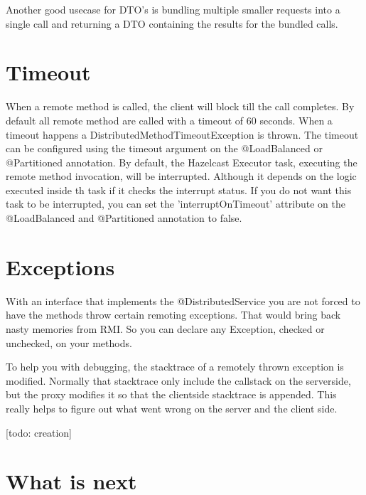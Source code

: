 Another good usecase for DTO's is bundling multiple smaller requests into a single call and returning a DTO containing the results for the bundled calls.

\section{Timeout}
When a remote method is called, the client will block till the call completes. By default all remote method are called with a timeout of 60 seconds. When a timeout happens a DistributedMethodTimeoutException is thrown. The timeout can be configured using the timeout argument on the @LoadBalanced or @Partitioned annotation. By default, the Hazelcast Executor task, executing the remote method invocation, will be interrupted. Although it depends on the logic executed inside th task if it checks the interrupt status. If you do not want this task to be interrupted, you can set the 'interruptOnTimeout' attribute on the @LoadBalanced and @Partitioned annotation to false.

\section{Exceptions}
With an interface that implements the @DistributedService you are not forced to have the methods throw certain remoting exceptions. That would bring back nasty memories from RMI. So you can declare any Exception, checked or unchecked, on your methods. 

To help you with debugging, the stacktrace of a remotely thrown exception is modified. Normally that stacktrace only include the callstack on the serverside, but the proxy modifies it so that the clientside stacktrace is appended. This really helps to figure out what went wrong on the server and the client side.

[todo: creation]

\section{What is next}

